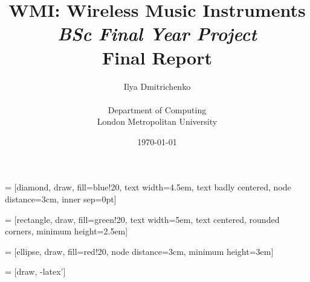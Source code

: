 \newcommand{\Blob}[1]{\Href{https://github.com/errordeveloper/contiki-wmi/blob/wmi-work/#1}{\texttt{#1}}}
\newcommand{\Tree}[1]{\Href{https://github.com/errordeveloper/contiki-wmi/tree/wmi-work/#1}{\texttt{#1}}}
\newcommand{\Blame}[1]{\Href{https://github.com/errordeveloper/contiki-wmi/blame/wmi-work/#1}{\texttt{#1}}}

\usepackage{tikz}
\usetikzlibrary{automata,positioning,shapes,arrows}

 = [diamond,
			draw, fill=blue!20,
			text width=4.5em, text badly centered,
			node distance=3cm, inner sep=0pt]

 = [rectangle,
			draw, fill=green!20,
			text width=5em, text centered,
			rounded corners, minimum height=2.5em]

 = [ellipse,
			draw, fill=red!20,
			node distance=3cm, minimum height=3em]

 = [draw, -latex']

\usepackage{pstricks-add}


\title{WMI: Wireless Music Instruments\\ \emph{BSc Final Year Project} \\ Final Report}
\author{Ilya Dmitrichenko \\ \\ Department of Computing\\ London Metropolitan University}

\date{\today}




\maketitle


